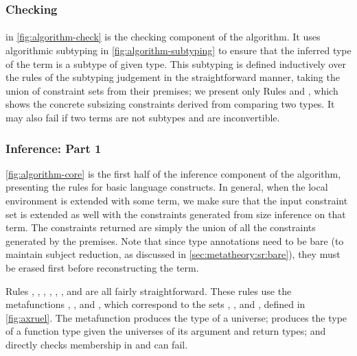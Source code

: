 


\subsubsection{Checking}

\paragraph*{}  in \autoref{fig:algorithm-check} is the checking component of the algorithm.
It uses algorithmic subtyping in \autoref{fig:algorithm-subtyping} to ensure that the inferred type of the term is a subtype of given type.
This subtyping is defined inductively over the rules of the subtyping judgement in the straightforward manner, taking the union of constraint sets from their premises;
we present only Rules  and ,
which shows the concrete subsizing constraints derived from comparing two \coinductive types.
It may also fail if two terms are not subtypes and are inconvertible.

\subsubsection{Inference: Part 1}



\autoref{fig:algorithm-core} is the first half of the inference component of the algorithm,
presenting the rules for basic language constructs.
In general, when the local environment is extended with some term, we make sure that the input constraint set is extended as well
with the constraints generated from size inference on that term.
The constraints returned are simply the union of all the constraints generated by the premises.
Note that since type annotations need to be bare (to maintain subject reduction, as discussed in \autoref{sec:metatheory:sr:bare}),
they must be erased first before reconstructing the term.

Rules , , , , , , and  are all fairly straightforward.
These rules use the metafunctions \axiom, , and \elim, which correspond to the sets \Axioms, \Rules, and \Elims, defined in \autoref{fig:axruel}.
The metafunction \axiom produces the type of a universe;  produces the type of a function type given the universes of its argument and return types; and \elim directly checks membership in \Elims and can fail.

